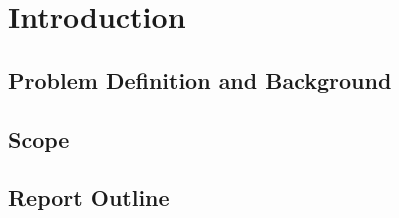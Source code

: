 \chapter{Introduction}

\minitoc

\newpage

\section{Problem Definition and Background}

\section{Scope}

\section{Report Outline}